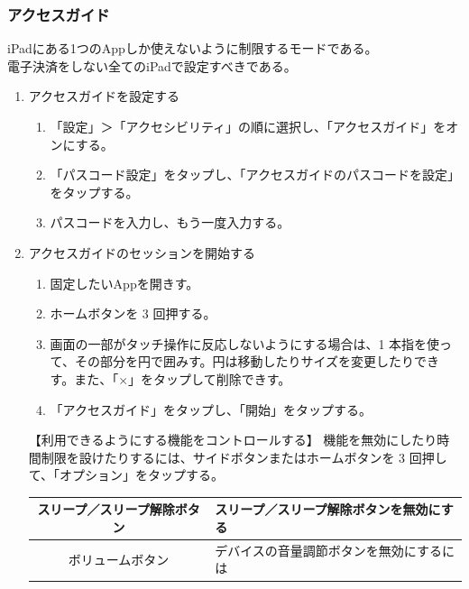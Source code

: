 \documentclass[dvipdfmx,jb5]{jreport}
\begin{document}
\subsubsection{アクセスガイド}
iPadにある1つのAppしか使えないように制限するモードである。\\
電子決済をしない全てのiPadで設定すべきである。
\begin{enumerate}
      \item アクセスガイドを設定する
            \begin{enumerate}[手順1.]
                  \item 「設定」＞「アクセシビリティ」の順に選択し、「アクセスガイド」をオンにする。
                  \item 「パスコード設定」をタップし、「アクセスガイドのパスコードを設定」をタップする。
                  \item パスコードを入力し、もう一度入力する。
            \end{enumerate}
      \item アクセスガイドのセッションを開始する
            \begin{enumerate}[手順1.]
                  \item 固定したいAppを開きす。
                  \item ホームボタンを 3 回押する。
                  \item 画面の一部がタッチ操作に反応しないようにする場合は、1 本指を使って、その部分を円で囲みす。円は移動したりサイズを変更したりできす。また、「$\times$」をタップして削除できす。
                  \item 「アクセスガイド」をタップし、「開始」をタップする。
            \end{enumerate}
            \begin{itembox}[l]{【利用できるようにする機能をコントロールする】}
                  機能を無効にしたり時間制限を設けたりするには、サイドボタンまたはホームボタンを 3 回押して、「オプション」をタップする。
                  \begin{center}
                        \begin{tabular}{|c|l|}\hline
                              スリープ／スリープ解除ボタン & スリープ／スリープ解除ボタンを無効にする                                                                                              \\ \hline
                              ボリュームボタン             & デバイスの音量調節ボタンを無効にするには                                                                                              \\ \hline

\end{tabular}
\end{center}
\end{itembox}
\end{enumerate}
\end{document}
